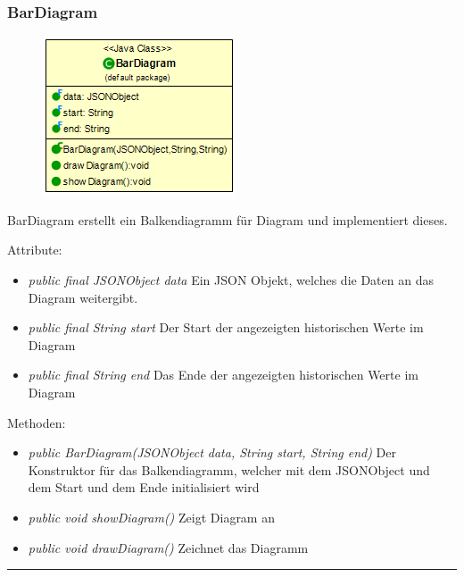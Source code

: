 \subsubsection{BarDiagram}
\begin{minipage}{0.3\textwidth}
    \begin{figure}[H]
        {\centering\includegraphics[scale = 0.5
        ]{media/view/diagram/BarDiagram_Class.png}}
    \end{figure}
    \end{minipage} \hfill
    \begin{minipage}{0.6\textwidth}
BarDiagram erstellt ein Balkendiagramm für Diagram und implementiert dieses.
\end{minipage}
Attribute: \begin{itemize} [noitemsep]
    \item \emph{public final JSONObject data} Ein JSON Objekt, welches die Daten an das Diagram weitergibt.
    \item \emph{public final String start} Der Start der angezeigten historischen Werte im Diagram
    \item \emph{public final String end} Das Ende der angezeigten historischen Werte im Diagram
\end{itemize}
Methoden: \begin{itemize} [noitemsep]
    \item \emph{public BarDiagram(JSONObject data, String start, String end)} Der Konstruktor für das Balkendiagramm, welcher mit dem JSONObject und dem Start und dem Ende initialisiert wird
    \item \emph{public void showDiagram()} Zeigt Diagram an
    \item \emph{public void drawDiagram()} Zeichnet das Diagramm
\end{itemize}

\rule{\textwidth}{0.4pt}
